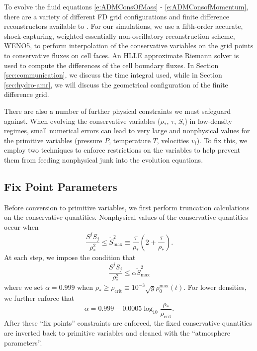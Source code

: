 To evolve the fluid equations \ref{e:ADMConsOfMass} - \ref{e:ADMConsofMomentum}, there are a variety of different FD grid configurations and finite difference reconstructors available to \SpEC.  For our simulations, we use a fifth-order accurate, shock-capturing, weighted essentially non-oscillatory reconstruction scheme, WENO5, to perform interpolation of the conservative variables on the grid points to conservative fluxes on cell faces.  An HLLE approximate Riemann solver is used to compute the differences of the cell boundary fluxes.
In Section \ref{sec:communication}, we discuss the time integral used, while in Section \ref{sec:hydro-amr}, we will discuss the geometrical configuration of the finite difference grid.

There are also a number of further physical constraints we must safeguard against.  When evolving the conservative variables ($\rho_*$, $\tau$, $S_i$) in low-density regimes, small numerical errors can lead to very large and nonphysical values for the primitive variables (pressure $P$, temperature $T$, velocities $v_i$).  To fix this, we employ two techniques to enforce restrictions on the variables to help prevent them from feeding nonphysical junk into the evolution equations.

\subsection*{Fix Point Parameters}

Before conversion to primitive variables, we first perform truncation calculations on the conservative quantities.  Nonphysical values of the conservative quantities occur when
\begin{equation}
\frac{S^j S_j}{\rho_*^2} \le \tilde{S}_\textrm{max}^2 \equiv \frac{\tau}{\rho_*}\left(2+\frac{\tau}{\rho_*}\right).
\end{equation}
At each step, we impose the condition that
\begin{equation}
\frac{S^j S_j}{\rho_*^2} \le \alpha \tilde{S}_\textrm{max}^2
\end{equation}
where we set $\alpha = 0.999$ when $\rho_* \ge \rho_\textrm{crit} \equiv  10^{-3} \sqrt{g} \rho_0^\textrm{max}(t)$.  For lower densities, we further enforce that 
\begin{equation}
\alpha = 0.999 - 0.0005 \log_{10}{\frac{\rho_*}{\rho_\textrm{crit}}}.
\end{equation}
After these ``fix points'' constraints are enforced, the fixed conservative quantities are inverted back to primitive variables and cleaned with the ``atmosphere parameters''.

